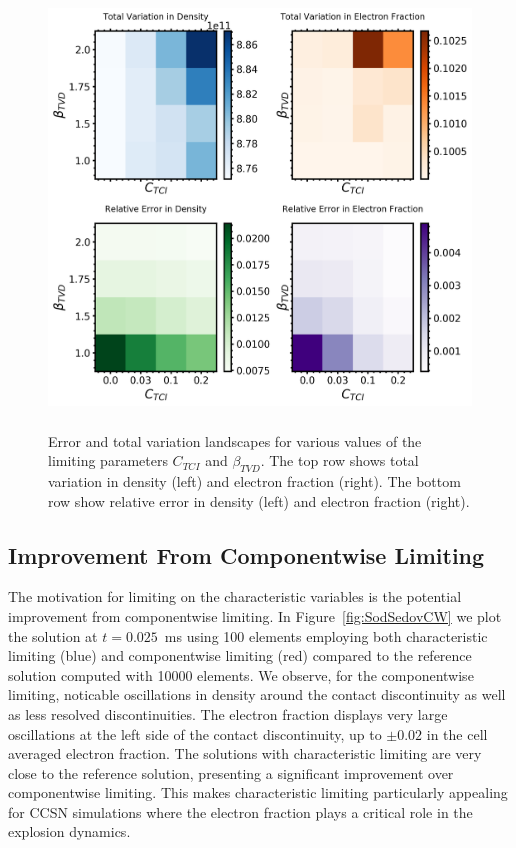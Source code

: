 \documentclass[onecolumn]{aastex62}
\begin{document}
\begin{figure}[b]
  \centering
  \includegraphics[width=32pc, height=27.5pc]{./figures/error_tv_landscape.png}
  \caption{\label{fig:landscape} Error and total variation landscapes for various
  values of the limiting parameters $C_{TCI}$ and $\beta_{TVD}$. The top row shows
  total variation in density (left) and electron fraction (right). The bottom
  row show relative error in density (left) and electron fraction (right).}
\end{figure}

\subsection{Improvement From Componentwise Limiting}
\label{sec:optimal}
The motivation for limiting on the characteristic variables is the potential
improvement from componentwise limiting. In Figure~\ref{fig:SodSedovCW} we plot the
solution at $t = 0.025$~ms using 100 elements employing both characteristic
limiting (blue) and componentwise limiting (red) compared to the reference
solution computed with 10000 elements. We observe, for the componentwise limiting,
noticable oscillations in density around the contact discontinuity as well
as less resolved discontinuities. The electron fraction displays very
large oscillations at the left side of the contact discontinuity, up to
$\pm 0.02$ in the cell averaged electron fraction. The solutions with
characteristic limiting are very close to the reference solution, presenting
a significant improvement over componentwise limiting.
This makes characteristic
limiting particularly appealing for CCSN simulations where the electron fraction
plays a critical role in the explosion dynamics.
\vspace{3cm}
\end{document}
